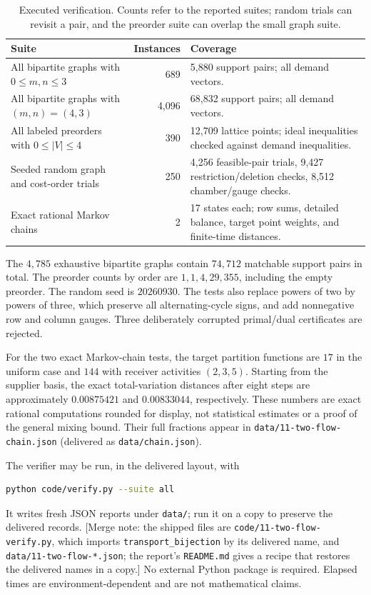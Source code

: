 \documentclass[11pt]{article}
\numberwithin{equation}{section}
\theoremstyle{definition}
\begin{document}
\begin{table}[htbp]\centering\small
\begin{tabularx}{\textwidth}{@{}p{}rY@{}}\toprule
Suite & Instances & Coverage\\\midrule
All bipartite graphs with $0\le m,n\le3$ & 689 & 5,880 support pairs;
all demand vectors.\\
All bipartite graphs with $(m,n)=(4,3)$ & 4,096 & 68,832 support pairs;
all demand vectors.\\
All labeled preorders with $0\le |V|\le4$ & 390 & 12,709 lattice points;
ideal inequalities checked against demand inequalities.\\
Seeded random graph and cost-order trials & 250 & 4,256 feasible-pair
trials, 9,427 restriction/deletion checks, 8,512 chamber/gauge checks.\\
Exact rational Markov chains & 2 & 17 states each; row sums, detailed
balance, target point weights, and finite-time distances.\\\bottomrule
\end{tabularx}
\caption{Executed verification. Counts refer to the reported suites;
random trials can revisit a pair, and the preorder suite can overlap the
small graph suite.}
\label{tf:tab:verification}
\end{table}

The $4{,}785$ exhaustive bipartite graphs contain $74{,}712$ matchable
support pairs in total. The preorder counts by order are
$1,1,4,29,355$, including the empty preorder. The random seed is
$20260930$. The tests also replace powers of two by powers of three,
which preserve all alternating-cycle signs, and add nonnegative row and
column gauges. Three deliberately corrupted primal/dual certificates are
rejected.

For the two exact Markov-chain tests, the target partition functions are
$17$ in the uniform case and $144$ with receiver activities $(2,3,5)$.
Starting from the supplier basis, the exact total-variation distances
after eight steps are approximately $0.00875421$ and $0.00833044$,
respectively. These numbers are exact rational computations rounded for
display, not statistical estimates or a proof of the general mixing
bound. Their full fractions appear in
\nolinkurl{data/11-two-flow-chain.json} (delivered as
\nolinkurl{data/chain.json}).

The verifier may be run, in the delivered layout, with
\begin{lstlisting}[language=bash]
python code/verify.py --suite all
\end{lstlisting}
It writes fresh JSON reports under \texttt{data/}; run it on a copy to
preserve the delivered records. [Merge note: the shipped files are
\nolinkurl{code/11-two-flow-verify.py}, which imports
\texttt{transport\_bijection} by its delivered name, and
\nolinkurl{data/11-two-flow-*.json}; the report's \texttt{README.md} gives
a recipe that restores the delivered names in a copy.] No external Python package is required.
Elapsed times are environment-dependent and are not mathematical claims.
\end{document}
